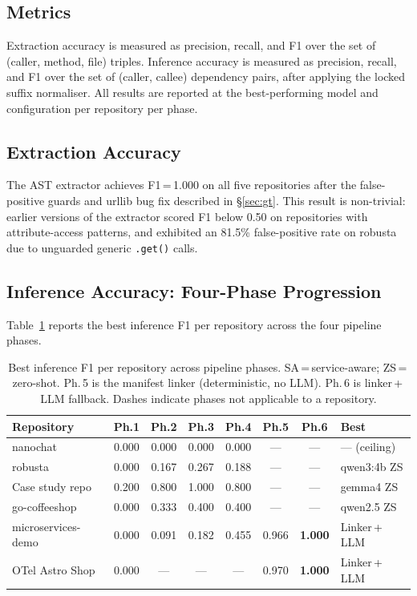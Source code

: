 \documentclass[runningheads]{llncs}
\begin{document}
\subsection{Metrics}

Extraction accuracy is measured as precision, recall, and F1 over the set
of (caller, method, file) triples. Inference accuracy is measured as
precision, recall, and F1 over the set of (caller, callee) dependency pairs,
after applying the locked suffix normaliser. All results are reported at the
best-performing model and configuration per repository per phase.

\subsection{Extraction Accuracy}

The AST extractor achieves F1\,=\,1.000 on all five repositories after the
false-positive guards and urllib bug fix described in \S\ref{sec:gt}. This
result is non-trivial: earlier versions of the extractor scored F1 below
0.50 on repositories with attribute-access patterns, and exhibited an 81.5\%
false-positive rate on robusta due to unguarded generic \texttt{.get()}
calls.

\subsection{Inference Accuracy: Four-Phase Progression}

Table~\ref{tab:inference} reports the best inference F1 per repository
across the four pipeline phases.

\begin{table}[t]
\caption{Best inference F1 per repository across pipeline phases.
  SA\,=\,service-aware; ZS\,=\,zero-shot. Ph.\,5 is the manifest linker
  (deterministic, no LLM). Ph.\,6 is linker\,+\,LLM fallback.
  Dashes indicate phases not applicable to a repository.}
\label{tab:inference}
\centering
\small
\begin{tabular}{lccccccl}
\toprule
Repository & Ph.1 & Ph.2 & Ph.3 & Ph.4 & Ph.5 & Ph.6 & Best \\
\midrule
nanochat           & 0.000 & 0.000 & 0.000 & 0.000 & ---   & ---   & --- (ceiling) \\
robusta            & 0.000 & 0.167 & 0.267 & 0.188 & ---   & ---   & qwen3:4b ZS \\
Case study repo    & 0.200 & 0.800 & 1.000 & 0.800 & ---   & ---   & gemma4 ZS \\
go-coffeeshop      & 0.000 & 0.333 & 0.400 & 0.400 & ---   & ---   & qwen2.5 ZS \\
microservices-demo & 0.000 & 0.091 & 0.182 & 0.455 & 0.966 & \textbf{1.000} & Linker\,+\,LLM \\
OTel Astro Shop   & 0.000 & ---   & ---   & ---   & 0.970 & \textbf{1.000} & Linker\,+\,LLM \\
\bottomrule
\end{tabular}
\end{table}
\end{document}
